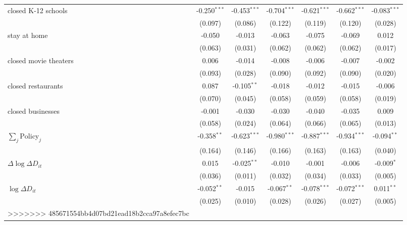 \begin{tabular}{lccccc|>{}c}
closed K-12 schools & -0.250$^{***}$ & -0.453$^{***}$ & -0.704$^{***}$ & -0.621$^{***}$ & -0.662$^{***}$ & -0.083$^{***}$\\
 & (0.097) & (0.086) & (0.122) & (0.119) & (0.120) & (0.028)\\
stay at home & -0.050 & -0.013 & -0.063 & -0.075 & -0.069 & 0.012\\
 & (0.063) & (0.031) & (0.062) & (0.062) & (0.062) & (0.017)\\
closed movie theaters & 0.006 & -0.014 & -0.008 & -0.006 & -0.007 & -0.002\\
 & (0.093) & (0.028) & (0.090) & (0.092) & (0.090) & (0.020)\\
closed restaurants & 0.087 & -0.105$^{**}$ & -0.018 & -0.012 & -0.015 & -0.006\\
 & (0.070) & (0.045) & (0.058) & (0.059) & (0.058) & (0.019)\\
closed businesses & -0.001 & -0.030 & -0.030 & -0.040 & -0.035 & 0.009\\
 & (0.058) & (0.024) & (0.064) & (0.066) & (0.065) & (0.013)\\
$\sum_j \mathrm{Policy}_j$ & -0.358$^{**}$ & -0.623$^{***}$ & -0.980$^{***}$ & -0.887$^{***}$ & -0.934$^{***}$ & -0.094$^{**}$\\
 & (0.164) & (0.146) & (0.166) & (0.163) & (0.163) & (0.040)\\
$\Delta \log \Delta D_{it}$ & 0.015 & -0.025$^{**}$ & -0.010 & -0.001 & -0.006 & -0.009$^{*}$\\
 & (0.036) & (0.011) & (0.032) & (0.034) & (0.033) & (0.005)\\
$\log \Delta D_{it}$ & -0.052$^{**}$ & -0.015 & -0.067$^{**}$ & -0.078$^{***}$ & -0.072$^{***}$ & 0.011$^{**}$\\
 & (0.025) & (0.010) & (0.028) & (0.026) & (0.027) & (0.005)\\
>>>>>>> 485671554bb4d07bd21ead18b2cca97a8efec7bc
\bottomrule
\end{tabular}